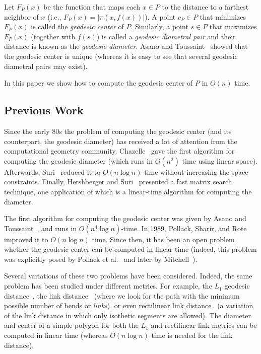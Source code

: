 \documentclass[a4paper]{article}
\newcommand{\F}[2]{\ensuremath{F_{\scriptscriptstyle #1}(#2)}}
\newcommand{\ff}[1]{\ensuremath{f(#1)}}
\newcommand{\cp}{\ensuremath{c_P}}
\newcommand{\g}[2]{\ensuremath{|\pi(#1, #2)|}}
\begin{document}
Let $\F{P}{x}$ be the function that maps each $x\in P$ to the distance to a farthest neighbor of $x$ (i.e., $\F{P}{x} = \g{x}{\ff{x}}$).
A point $\cp\in P$ that minimizes $\F{P}{x}$ is called the \emph{geodesic center} of $P$. Similarly, a point $s\in P$ that maximizes $\F{P}{x}$ (together with $\ff{s}$) is called a \emph{geodesic diametral pair} and their distance is known as the \emph{geodesic diameter}. Asano and Toussaint~\cite{at-cgcsp-85} showed that the geodesic center is unique (whereas it is easy to see that several geodesic diametral pairs may exist).

In this paper we show how to compute the geodesic center of $P$ in $O(n)$ time.

\subsection{Previous Work}
Since the early 80s the problem of computing the geodesic center (and its counterpart, the geodesic diameter) has received a lot of attention from the computational geometry community. Chazelle~\cite{c-tpca-82} gave the first algorithm for computing the geodesic diameter (which runs in $O(n^2)$ time using linear space). Afterwards, Suri~\cite{suri1989computing} reduced it to $O(n\log n)$-time without increasing the space constraints. Finally, Hershberger and Suri~\cite{hershberger1993matrix} presented a fast matrix search technique, one application of which is a linear-time algorithm for computing the diameter.

The first algorithm for computing the geodesic center was given by Asano and Toussaint~\cite{at-cgcsp-85}, and runs in $O(n^4\log n)$-time. In 1989, Pollack, Sharir, and Rote~\cite{pollackComputingCenter} improved it to $O(n\log n)$ time. Since then, it has been an open problem whether the geodesic center can be
computed in linear time (indeed, this problem was explicitly posed by Pollack et al.~\cite{pollackComputingCenter} and later by Mitchell~\cite[Chapter 27]{m-gspno-00}).

Several variations of these two problems have been considered. Indeed, the same problem has been studied under different metrics. For example, the $L_1$ geodesic distance~\cite{bkow-clgdcsplt-13},  the link distance~\cite{suri-mlpprp-87,k-ealdp-89,dls-aclcsp-92} (where we look for the path with the minimum possible number of bends or {\em links}), or even rectilinear link distance~\cite{ns-crldp-91,ns-oarlcrp-96} (a variation of the link distance in which only isothetic segments are allowed). The diameter and center of a simple polygon for both the $L_1$ and rectilinear link metrics can be computed in linear time (whereas $O(n\log n)$ time is needed for the link distance).
\end{document}
